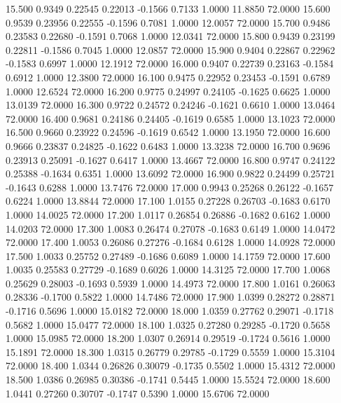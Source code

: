   15.500   0.9349   0.22545   0.22013  -0.1566   0.7133   1.0000  11.8850  72.0000
  15.600   0.9539   0.23956   0.22555  -0.1596   0.7081   1.0000  12.0057  72.0000
  15.700   0.9486   0.23583   0.22680  -0.1591   0.7068   1.0000  12.0341  72.0000
  15.800   0.9439   0.23199   0.22811  -0.1586   0.7045   1.0000  12.0857  72.0000
  15.900   0.9404   0.22867   0.22962  -0.1583   0.6997   1.0000  12.1912  72.0000
  16.000   0.9407   0.22739   0.23163  -0.1584   0.6912   1.0000  12.3800  72.0000
  16.100   0.9475   0.22952   0.23453  -0.1591   0.6789   1.0000  12.6524  72.0000
  16.200   0.9775   0.24997   0.24105  -0.1625   0.6625   1.0000  13.0139  72.0000
  16.300   0.9722   0.24572   0.24246  -0.1621   0.6610   1.0000  13.0464  72.0000
  16.400   0.9681   0.24186   0.24405  -0.1619   0.6585   1.0000  13.1023  72.0000
  16.500   0.9660   0.23922   0.24596  -0.1619   0.6542   1.0000  13.1950  72.0000
  16.600   0.9666   0.23837   0.24825  -0.1622   0.6483   1.0000  13.3238  72.0000
  16.700   0.9696   0.23913   0.25091  -0.1627   0.6417   1.0000  13.4667  72.0000
  16.800   0.9747   0.24122   0.25388  -0.1634   0.6351   1.0000  13.6092  72.0000
  16.900   0.9822   0.24499   0.25721  -0.1643   0.6288   1.0000  13.7476  72.0000
  17.000   0.9943   0.25268   0.26122  -0.1657   0.6224   1.0000  13.8844  72.0000
  17.100   1.0155   0.27228   0.26703  -0.1683   0.6170   1.0000  14.0025  72.0000
  17.200   1.0117   0.26854   0.26886  -0.1682   0.6162   1.0000  14.0203  72.0000
  17.300   1.0083   0.26474   0.27078  -0.1683   0.6149   1.0000  14.0472  72.0000
  17.400   1.0053   0.26086   0.27276  -0.1684   0.6128   1.0000  14.0928  72.0000
  17.500   1.0033   0.25752   0.27489  -0.1686   0.6089   1.0000  14.1759  72.0000
  17.600   1.0035   0.25583   0.27729  -0.1689   0.6026   1.0000  14.3125  72.0000
  17.700   1.0068   0.25629   0.28003  -0.1693   0.5939   1.0000  14.4973  72.0000
  17.800   1.0161   0.26063   0.28336  -0.1700   0.5822   1.0000  14.7486  72.0000
  17.900   1.0399   0.28272   0.28871  -0.1716   0.5696   1.0000  15.0182  72.0000
  18.000   1.0359   0.27762   0.29071  -0.1718   0.5682   1.0000  15.0477  72.0000
  18.100   1.0325   0.27280   0.29285  -0.1720   0.5658   1.0000  15.0985  72.0000
  18.200   1.0307   0.26914   0.29519  -0.1724   0.5616   1.0000  15.1891  72.0000
  18.300   1.0315   0.26779   0.29785  -0.1729   0.5559   1.0000  15.3104  72.0000
  18.400   1.0344   0.26826   0.30079  -0.1735   0.5502   1.0000  15.4312  72.0000
  18.500   1.0386   0.26985   0.30386  -0.1741   0.5445   1.0000  15.5524  72.0000
  18.600   1.0441   0.27260   0.30707  -0.1747   0.5390   1.0000  15.6706  72.0000
